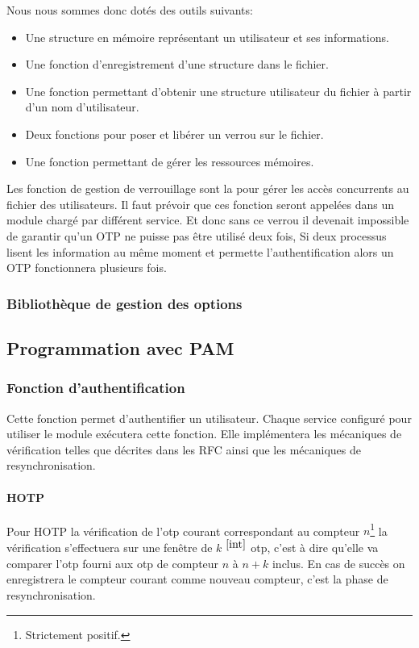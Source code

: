 Nous nous sommes donc dotés des outils suivants:
\begin{itemize}
  \item Une structure en mémoire représentant un utilisateur et ses 
  informations.
  \item Une fonction d'enregistrement d'une structure dans le fichier.
  \item Une fonction permettant d'obtenir une structure utilisateur du fichier 
  à partir d'un nom d'utilisateur.
  \item Deux fonctions pour poser et libérer un verrou sur le fichier.
  \item Une fonction permettant de gérer les ressources mémoires.\\
\end{itemize}

Les fonction de gestion de verrouillage sont la pour gérer les accès concurrents 
au fichier des utilisateurs. Il faut prévoir que ces fonction seront appelées 
dans un module chargé par différent service. Et donc sans ce verrou il devenait 
impossible de garantir qu'un OTP ne puisse pas être utilisé deux fois, Si deux 
processus lisent les information au même moment et permette l'authentification 
alors un OTP fonctionnera plusieurs fois.

\subsubsection{Bibliothèque de gestion des options}


\subsection{Programmation avec PAM}
\subsubsection{Fonction d'authentification}
Cette fonction permet d'authentifier un utilisateur. Chaque service configuré
pour utiliser le module exécutera cette fonction. Elle implémentera les 
mécaniques de vérification telles que décrites dans les RFC ainsi que les 
mécaniques de resynchronisation.
\paragraph{HOTP}
Pour HOTP la vérification de l'otp courant correspondant au compteur 
$n$\footnote{Strictement positif.\label{int}} la vérification s'effectuera sur 
une fenêtre de  $k$ $^{\ref{int}}$ otp, c'est à dire qu'elle va comparer l'otp 
fourni aux otp de compteur $n$ à $n+k$ inclus. En cas de succès on enregistrera 
le compteur courant comme nouveau compteur, c'est la phase de resynchronisation.
